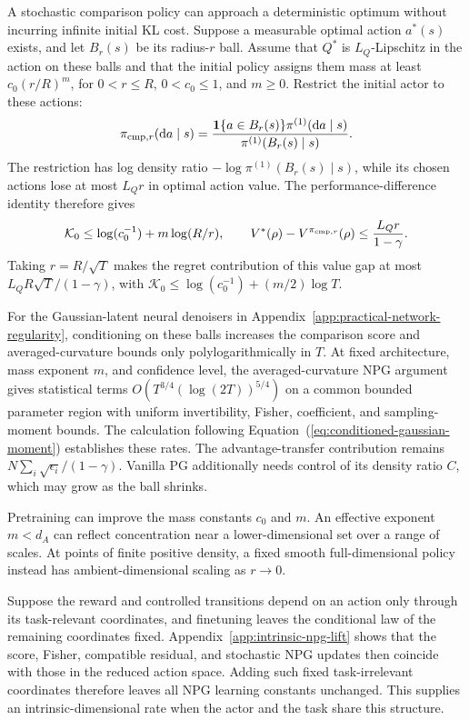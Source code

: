 \begin{exmp}\label{ex:small-ball-comparator}
A stochastic comparison policy can approach a deterministic optimum without incurring infinite initial KL cost. Suppose a measurable optimal action $a^*(s)$ exists, and let $B_r(s)$ be its radius-$r$ ball. Assume that $Q^*$ is $L_Q$-Lipschitz in the action on these balls and that the initial policy assigns them mass at least $c_0(r/R)^m$, for $0<r\leq R$, $0<c_0\leq1$, and $m\geq0$. Restrict the initial actor to these actions:
\[
\pi_{{\rm cmp},r}(\mathrm da\mid s)
=\frac{\mathbf1\{a\in B_r(s)\}\pi^{(1)}(\mathrm da\mid s)}{\pi^{(1)}(B_r(s)\mid s)}.
\]
The restriction has log density ratio $-\log\pi^{(1)}(B_r(s)\mid s)$, while its chosen actions lose at most $L_Qr$ in optimal action value. The performance-difference identity therefore gives
\[
\mathcal K_0\leq\log(c_0^{-1})+m\log(R/r),\qquad
V^*(\rho)-V^{\pi_{{\rm cmp},r}}(\rho)\leq\frac{L_Qr}{1-\gamma}.
\]
Taking $r=R/\sqrt T$ makes the regret contribution of this value gap at most $L_QR\sqrt T/(1-\gamma)$, with $\mathcal K_0\leq\log(c_0^{-1})+(m/2)\log T$.

For the Gaussian-latent neural denoisers in Appendix~\ref{app:practical-network-regularity}, conditioning on these balls increases the comparison score and averaged-curvature bounds only polylogarithmically in $T$. At fixed architecture, mass exponent $m$, and confidence level, the averaged-curvature NPG argument gives statistical terms $O(T^{3/4}(\log(2T))^{5/4})$ on a common bounded parameter region with uniform invertibility, Fisher, coefficient, and sampling-moment bounds. The calculation following Equation~(\ref{eq:conditioned-gaussian-moment}) establishes these rates. The advantage-transfer contribution remains $N\sum_i\sqrt{\epsilon_i}/(1-\gamma)$. Vanilla PG additionally needs control of its density ratio $C$, which may grow as the ball shrinks.

Pretraining can improve the mass constants $c_0$ and $m$. An effective exponent $m<d_A$ can reflect concentration near a lower-dimensional set over a range of scales. At points of finite positive density, a fixed smooth full-dimensional policy instead has ambient-dimensional scaling as $r\to0$. \end{exmp}


\begin{exmp}
Suppose the reward and controlled transitions depend on an action only through its task-relevant coordinates, and finetuning leaves the conditional law of the remaining coordinates fixed. Appendix~\ref{app:intrinsic-npg-lift} shows that the score, Fisher, compatible residual, and stochastic NPG updates then coincide with those in the reduced action space. Adding such fixed task-irrelevant coordinates therefore leaves all NPG learning constants unchanged. This supplies an intrinsic-dimensional rate when the actor and the task share this structure.
\end{exmp}

